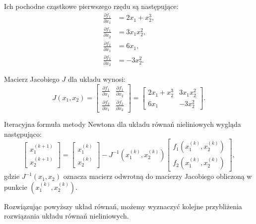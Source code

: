 \documentclass{article}
\begin{document}
Ich pochodne cząstkowe pierwszego rzędu są następujące:
\begin{align*}
    \frac{\partial f_1}{\partial x_1} &= 2x_1 + x_2^3, \\
    \frac{\partial f_1}{\partial x_2} &= 3x_1 x_2^2, \\
    \frac{\partial f_2}{\partial x_1} &= 6x_1, \\
    \frac{\partial f_2}{\partial x_2} &= -3x_2^2.
\end{align*}

Macierz Jacobiego \( J \) dla układu wynosi:
\begin{equation*}
    J(x_1, x_2) =
    \begin{bmatrix}
    \frac{\partial f_1}{\partial x_1} & \frac{\partial f_1}{\partial x_2} \\
    \frac{\partial f_2}{\partial x_1} & \frac{\partial f_2}{\partial x_2}
    \end{bmatrix}
    =
    \begin{bmatrix}
    2x_1 + x_2^3 & 3x_1 x_2^2 \\
    6x_1 & -3x_2^2
    \end{bmatrix}.
\end{equation*}

Iteracyjna formuła metody Newtona dla układu równań nieliniowych wygląda następująco:
\begin{equation*}
    \begin{bmatrix}
    x_1^{(k+1)} \\
    x_2^{(k+1)}
    \end{bmatrix}
    =
    \begin{bmatrix}
    x_1^{(k)} \\
    x_2^{(k)}
    \end{bmatrix}
    -
    J^{-1}(x_1^{(k)}, x_2^{(k)})
    \begin{bmatrix}
    f_1(x_1^{(k)}, x_2^{(k)}) \\
    f_2(x_1^{(k)}, x_2^{(k)})
    \end{bmatrix},
\end{equation*}
gdzie \( J^{-1}(x_1, x_2) \) oznacza macierz odwrotną do macierzy Jacobiego obliczoną w punkcie \( (x_1^{(k)}, x_2^{(k)}) \).

Rozwiązując powyższy układ równań, możemy wyznaczyć kolejne przybliżenia rozwiązania układu równań nieliniowych.
\end{document}
